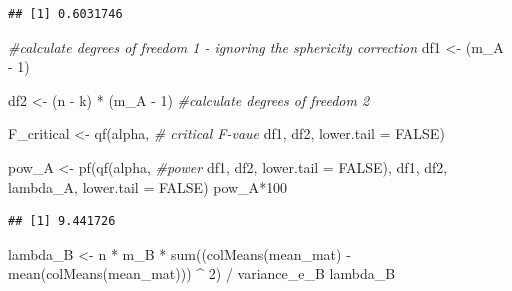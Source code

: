 \documentclass[
]{book}
\newenvironment{Shaded}{\begin{snugshade}}{\end{snugshade}}
\newcommand{\AttributeTok}[1]{\textcolor[rgb]{0.77,0.63,0.00}{#1}}
\newcommand{\CommentTok}[1]{\textcolor[rgb]{0.56,0.35,0.01}{\textit{#1}}}
\newcommand{\ConstantTok}[1]{\textcolor[rgb]{0.00,0.00,0.00}{#1}}
\newcommand{\DecValTok}[1]{\textcolor[rgb]{0.00,0.00,0.81}{#1}}
\newcommand{\FunctionTok}[1]{\textcolor[rgb]{0.00,0.00,0.00}{#1}}
\newcommand{\NormalTok}[1]{#1}
\newcommand{\OtherTok}[1]{\textcolor[rgb]{0.56,0.35,0.01}{#1}}
\newcommand{\SpecialCharTok}[1]{\textcolor[rgb]{0.00,0.00,0.00}{#1}}
\begin{document}
\begin{verbatim}
## [1] 0.6031746
\end{verbatim}

\begin{Shaded}
\begin{Highlighting}[]
\CommentTok{\#calculate degrees of freedom 1 {-} ignoring the sphericity correction}
\NormalTok{df1 }\OtherTok{\textless{}{-}}\NormalTok{ (m\_A }\SpecialCharTok{{-}} \DecValTok{1}\NormalTok{) }

\NormalTok{df2 }\OtherTok{\textless{}{-}}\NormalTok{ (n }\SpecialCharTok{{-}}\NormalTok{ k) }\SpecialCharTok{*}\NormalTok{ (m\_A }\SpecialCharTok{{-}} \DecValTok{1}\NormalTok{) }\CommentTok{\#calculate degrees of freedom 2}

\NormalTok{F\_critical }\OtherTok{\textless{}{-}} \FunctionTok{qf}\NormalTok{(alpha, }\CommentTok{\# critical F{-}vaue}
\NormalTok{                 df1,}
\NormalTok{                 df2, }
                 \AttributeTok{lower.tail =} \ConstantTok{FALSE}\NormalTok{) }

\NormalTok{pow\_A }\OtherTok{\textless{}{-}} \FunctionTok{pf}\NormalTok{(}\FunctionTok{qf}\NormalTok{(alpha, }\CommentTok{\#power }
\NormalTok{             df1, }
\NormalTok{             df2, }
             \AttributeTok{lower.tail =} \ConstantTok{FALSE}\NormalTok{), }
\NormalTok{          df1, }
\NormalTok{          df2, }
\NormalTok{          lambda\_A, }
          \AttributeTok{lower.tail =} \ConstantTok{FALSE}\NormalTok{)}
\NormalTok{pow\_A}\SpecialCharTok{*}\DecValTok{100}
\end{Highlighting}
\end{Shaded}

\begin{verbatim}
## [1] 9.441726
\end{verbatim}

\begin{Shaded}
\begin{Highlighting}[]
\NormalTok{lambda\_B }\OtherTok{\textless{}{-}}
\NormalTok{  n }\SpecialCharTok{*}\NormalTok{ m\_B }\SpecialCharTok{*} \FunctionTok{sum}\NormalTok{((}\FunctionTok{colMeans}\NormalTok{(mean\_mat) }\SpecialCharTok{{-}} 
                   \FunctionTok{mean}\NormalTok{(}\FunctionTok{colMeans}\NormalTok{(mean\_mat))) }\SpecialCharTok{\^{}} \DecValTok{2}\NormalTok{) }\SpecialCharTok{/}\NormalTok{ variance\_e\_B }
\NormalTok{lambda\_B}
\end{Highlighting}
\end{Shaded}
\end{document}
